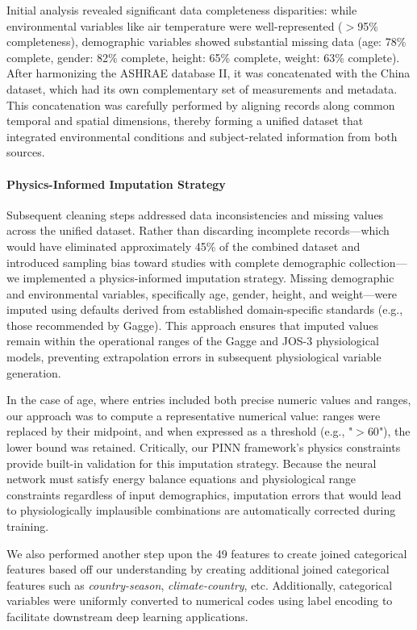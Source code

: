 Initial analysis revealed significant data completeness disparities: while environmental variables like air temperature were well-represented ($>$95\% completeness), demographic variables showed substantial missing data (age: 78\% complete, gender: 82\% complete, height: 65\% complete, weight: 63\% complete). After harmonizing the ASHRAE database II, it was concatenated with the China dataset, which had its own complementary set of measurements and metadata. This concatenation was carefully performed by aligning records along common temporal and spatial dimensions, thereby forming a unified dataset that integrated environmental conditions and subject-related information from both sources.

\paragraph{Physics-Informed Imputation Strategy} Subsequent cleaning steps addressed data inconsistencies and missing values across the unified dataset. Rather than discarding incomplete records—which would have eliminated approximately 45\% of the combined dataset and introduced sampling bias toward studies with complete demographic collection—we implemented a physics-informed imputation strategy. Missing demographic and environmental variables, specifically age, gender, height, and weight—were imputed using defaults derived from established domain-specific standards (e.g., those recommended by Gagge). This approach ensures that imputed values remain within the operational ranges of the Gagge and JOS-3 physiological models, preventing extrapolation errors in subsequent physiological variable generation.

In the case of age, where entries included both precise numeric values and ranges, our approach was to compute a representative numerical value: ranges were replaced by their midpoint, and when expressed as a threshold (e.g., "$>60$"), the lower bound was retained. Critically, our PINN framework's physics constraints provide built-in validation for this imputation strategy. Because the neural network must satisfy energy balance equations and physiological range constraints regardless of input demographics, imputation errors that would lead to physiologically implausible combinations are automatically corrected during training.

We also performed another step upon the 49 features to create joined categorical features based off our understanding by creating additional joined categorical features such as \textit{country-season}, \textit{climate-country}, etc. Additionally, categorical variables were uniformly converted to numerical codes using label encoding to facilitate downstream deep learning applications. 

